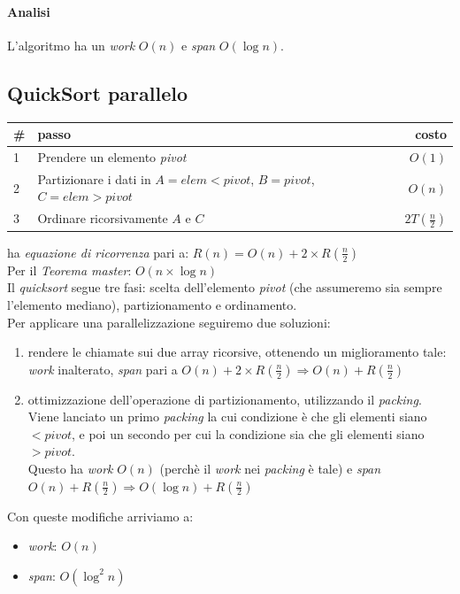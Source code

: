\paragraph{Analisi}
L'algoritmo ha un \textit{work} $O(n)$ e \textit{span} $O(\log{n})$.

\subsection{QuickSort parallelo}
\begin{center}
	\begin{tabular}{| l | l | r |}
		\hline
		\textbf{\#} & \textbf{passo} & \textbf{costo} \\ \hline
		1 & Prendere un elemento \textit{pivot} & $O(1)$ \\
		2 & Partizionare i dati in $A = elem < pivot$, $B = pivot$, $C = elem > pivot$ & $O(n)$ \\
		3 & Ordinare ricorsivamente $A$ e $C$ & $2T(\frac{n}{2})$ \\
		\hline
	\end{tabular}
\end{center}
ha \textit{equazione di ricorrenza} pari a: $R(n) = O(n) + 2\times R(\frac{n}{2})$ \\
Per il \textit{Teorema master}: $O(n\times \log n)$ \\
Il \textit{quicksort} segue tre fasi: scelta dell'elemento \textit{pivot} (che assumeremo sia sempre l'elemento mediano), partizionamento e ordinamento. \\
Per applicare una parallelizzazione seguiremo due soluzioni:
\begin{enumerate}
	\item rendere le chiamate sui due array ricorsive, ottenendo un miglioramento tale: \textit{work} inalterato, \textit{span} pari a $O(n) + 2\times R(\frac{n}{2}) \Rightarrow O(n) + R(\frac{n}{2})$
	\item ottimizzazione dell'operazione di partizionamento, utilizzando il \textit{packing}. Viene lanciato un primo \textit{packing} la cui condizione \`e che gli elementi siano $< pivot$, e poi un secondo per cui la condizione sia che gli elementi siano $> pivot$. \\
	Questo ha \textit{work} $O(n)$ (perch\`e il \textit{work} nei \textit{packing} \`e tale) e \textit{span} $O(n) + R(\frac{n}{2}) \Rightarrow O(\log n) + R(\frac{n}{2})$
\end{enumerate}
Con queste modifiche arriviamo a:
\begin{itemize}
	\item \textit{work}: $O(n)$
	\item \textit{span}: $O(\log^2 n)$
\end{itemize}

